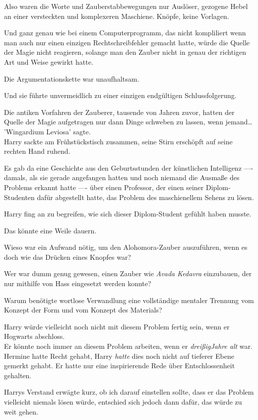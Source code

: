 {Also waren die Worte und Zauberstabbewegungen nur Auslöser, gezogene Hebel an einer versteckten und komplexeren Maschiene. Knöpfe, keine Vorlagen.

Und ganz genau wie bei einem Computerprogramm, das nicht kompliliert wenn man auch nur einen einzigen Rechtschreibfehler gemacht hatte, würde die Quelle der Magie nicht reagieren, solange man den Zauber nicht in genau der richtigen Art und Weise gewirkt hatte.

Die Argumentationskette war unaufhaltsam.

Und sie führte unvermeidlich zu einer einzigen endgültigen Schlussfolgerung.

Die antiken Vorfahren der Zauberer, tausende von Jahren zuvor, hatten der Quelle der Magie aufgetragen nur dann Dinge schweben zu lassen, wenn jemand…\\ 'Wingardium Leviosa' sagte.\\ Harry sackte am Frühstückstisch zusammen, seine Stirn erschöpft auf seine rechten Hand ruhend.

Es gab da eine Geschichte aus den Geburtsstunden der künstlichen Intelligenz ---- damals, als sie gerade angefangen hatten und noch niemand die Ausmaße des Problems erkannt hatte ---- über einen Professor, der einen seiner Diplom-Studenten dafür abgestellt hatte, das Problem des maschienellem Sehens zu lösen.

Harry fing an zu begreifen, wie sich dieser Diplom-Student gefühlt haben musste.

Das könnte eine Weile dauern.

Wieso war ein Aufwand nötig, um den Alohomora-Zauber auszuführen, wenn es doch wie das Drücken eines Knopfes war?

Wer war dumm genug gewesen, einen Zauber wie \emph{Avada Kedavra} einzubauen, der nur mithilfe von Hass eingesetzt werden konnte?

Warum benötigte wortlose Verwandlung eine vollständige mentaler Trennung vom Konzept der Form und vom Konzept des Materials?

Harry würde vielleicht noch nicht mit diesem Problem fertig sein, wenn er Hogwarts abschloss.\\ Er könnte noch immer an diesem Problem arbeiten, wenn er \emph{dreißigJahre alt} war. Hermine hatte Recht gehabt, Harry \emph{hatte} dies noch nicht auf tieferer Ebene gemerkt gehabt. Er hatte nur eine inspirierende Rede über Entschlossenheit gehalten.

Harrys Verstand erwägte kurz, ob ich darauf einstellen sollte, dass er das Problem vielleicht niemals lösen würde, entschied sich jedoch dann dafür, das würde zu weit gehen.

}
